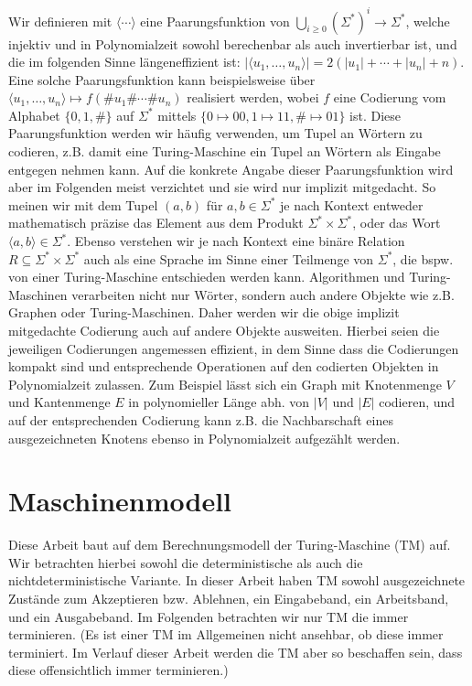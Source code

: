 Wir definieren mit $\langle\cdots\rangle$ eine Paarungsfunktion von $\bigcup_{i\geq 0} (\Sigma^*)^i \to \Sigma^*$, welche injektiv und in Polynomialzeit sowohl berechenbar als auch invertierbar ist, und die im folgenden Sinne längeneffizient ist: $|\langle u_1, \dots, u_n\rangle| = 2(|u_1|+\cdots+|u_n|+n)$. Eine solche Paarungsfunktion kann beispielsweise über $\langle u_1, \dots, u_n\rangle\mapsto f(\#u_1\#\cdots\#u_n)$ realisiert werden, wobei $f$ eine Codierung vom Alphabet $\{0,1,\#\}$ auf $\Sigma^*$ mittels $\{0\mapsto 00, 1\mapsto 11, \#\mapsto 01\}$ ist.
Diese Paarungsfunktion werden wir häufig verwenden, um Tupel an Wörtern zu codieren, z.B. damit eine Turing-Maschine ein Tupel an Wörtern als Eingabe entgegen nehmen kann. Auf die konkrete Angabe dieser Paarungsfunktion wird aber im Folgenden meist verzichtet und sie wird nur implizit mitgedacht. So meinen wir mit dem Tupel $(a,b)$ für $a,b\in\Sigma^*$ je nach Kontext entweder mathematisch präzise das Element aus dem Produkt $\Sigma^*\times\Sigma^*$, oder das Wort $\langle a,b\rangle\in\Sigma^*$. Ebenso verstehen wir je nach Kontext eine binäre Relation $R\subseteq\Sigma^*\times\Sigma^*$ auch als eine Sprache im Sinne einer Teilmenge von $\Sigma^*$, die bspw. von einer Turing-Maschine entschieden werden kann.
Algorithmen und Turing-Maschinen verarbeiten nicht nur Wörter, sondern auch andere Objekte wie z.B. Graphen oder Turing-Maschinen.
Daher werden wir die obige implizit mitgedachte Codierung auch auf andere Objekte ausweiten. Hierbei seien die jeweiligen Codierungen angemessen effizient, in dem Sinne dass die Codierungen kompakt sind und entsprechende Operationen auf den codierten Objekten in Polynomialzeit zulassen. Zum Beispiel lässt sich ein Graph mit Knotenmenge $V$ und Kantenmenge $E$ in polynomieller Länge abh. von $|V|$ und $|E|$ codieren, und auf der entsprechenden Codierung kann z.B. die Nachbarschaft eines ausgezeichneten Knotens ebenso in Polynomialzeit aufgezählt werden.

\section{Maschinenmodell}\label{sec:prelim-machines}

Diese Arbeit baut auf dem Berechnungsmodell der Turing-Maschine (TM) auf. Wir betrachten hierbei sowohl die deterministische als auch die nichtdeterministische Variante. In dieser Arbeit haben TM sowohl ausgezeichnete Zustände zum Akzeptieren bzw. Ablehnen, ein Eingabeband, ein Arbeitsband, und ein Ausgabeband. Im Folgenden betrachten wir nur TM die immer terminieren. (Es ist einer TM im Allgemeinen nicht ansehbar, ob diese immer terminiert. Im Verlauf dieser Arbeit werden die TM aber so beschaffen sein, dass diese offensichtlich immer terminieren.) 

